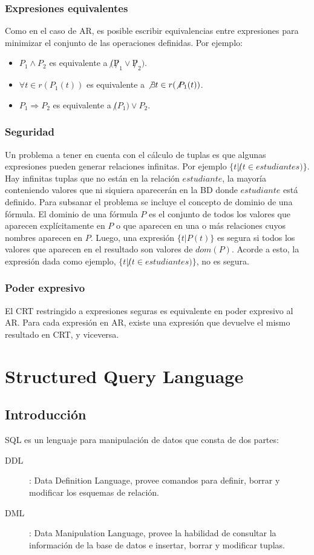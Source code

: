\documentclass[a4paper]{article}
\begin{document}
\subsubsection*{Expresiones equivalentes}
Como en el caso de AR, es posible escribir equivalencias entre expresiones para minimizar el
conjunto de las operaciones definidas. Por ejemplo:
\begin{itemize}
    \item $P_{1} \land P_{2}$ es equivalente a $\not (\not P_{1} \lor \not P_{2})$.
    \item $\forall t \in r(P_{1}(t))$ es equivalente a $\not \exists t \in r(\not P_{1}(t))$.
    \item $P_{1} \Rightarrow P_{2}$ es equivalente a $\not (P_{1}) \lor P_{2}$.
\end{itemize}
\subsubsection*{Seguridad}
Un problema a tener en cuenta con el c\'alculo de tuplas es que algunas expresiones pueden
generar relaciones infinitas. Por ejemplo $\{ t | \not (t \in estudiantes) \}$. Hay infinitas
tuplas que no est\'an en la relaci\'on $estudiante$, la mayor\'ia conteniendo valores que ni
siquiera aparecer\'an en la BD donde $estudiante$ est\'a definido. Para subsanar el problema
se incluye el concepto de dominio de una f\'ormula. El dominio de una f\'ormula $P$ es el
conjunto de todos los valores que aparecen expl\'icitamente en $P$ o que aparecen en una o m\'as
relaciones cuyos nombres aparecen en $P$. Luego, una expresi\'on $\{ t | P(t) \}$ es segura si
todos los valores que aparecen en el resultado son valores de $dom(P)$. Acorde a esto, la
expresi\'on dada como ejemplo, $\{ t | \not (t \in estudiantes) \}$, no es segura.
\subsubsection*{Poder expresivo}
El CRT restringido a expresiones seguras es equivalente en poder expresivo al AR. Para cada
expresi\'on en AR, existe una expresi\'on que devuelve el mismo resultado en CRT, y viceversa.





\section{Structured Query Language}
\subsection{Introducci\'on}
SQL es un lenguaje para manipulaci\'on de datos que consta de dos partes:
\begin{description}
    \item[DDL]: Data Definition Language, provee comandos para definir, borrar y modificar
    los esquemas de relaci\'on.
    \item[DML]: Data Manipulation Language, provee la habilidad de consultar la informaci\'on
    de la base de datos e insertar, borrar y modificar tuplas.
\end{description}
\end{document}
